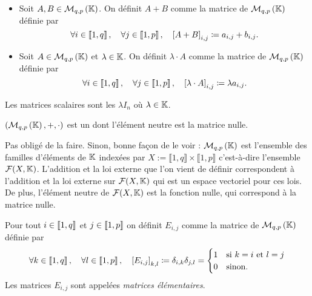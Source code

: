 \documentclass{magnolia}
\begin{document}
\begin{definition}[utile=-3]
$\quad$
\begin{itemize}
\item Soit $A,B\in\mathcal{M}_{q,p}\left(\mathbb{K}\right)$. On définit $A+B$ comme la matrice
  de $\mathcal{M}_{q,p}\left(\mathbb{K}\right)$ définie par
  \[\forall i\in\left\llbracket 1,q\right\rrbracket ,\quad \forall j\in\left\llbracket 1,p\right\rrbracket ,\quad
    \left[A+B\right]_{i,j}\coloneqq a_{i,j}+b_{i,j}.\]
\item Soit $A\in\mathcal{M}_{q,p}\left(\mathbb{K}\right)$ et $\lambda\in\mathbb{K}$. On définit 
  $\lambda\cdot A$  comme la matrice de $\mathcal{M}_{q,p}\left(\mathbb{K}\right)$ définie par
  \[\forall i\in\left\llbracket 1,q\right\rrbracket ,\quad \forall j\in\left\llbracket 1,p\right\rrbracket ,\quad
    \left[\lambda\cdot A\right]_{i,j}\coloneqq \lambda a_{i,j}.\]
\end{itemize}
\end{definition}

\begin{remarqueUnique}
\remarque Les matrices scalaires sont les $\lambda I_n$ où $\lambda\in\mathbb{K}$.
\end{remarqueUnique}

\begin{proposition}[utile=-3]
$\left(\mathcal{M}_{q,p}\left(\mathbb{K}\right),+,\cdot\right)$ est un \Kev dont l'élément neutre est la matrice
nulle.
\end{proposition}

\begin{preuve}
Pas obligé de la faire.
Sinon, bonne façon de le voir :
$\mathcal{M}_{q,p}\left(\mathbb{K}\right)$ est l'ensemble des familles d'éléments de $\mathbb{K}$ indexées par $X:=\llbracket 1,q\rrbracket \times \llbracket 1,p\rrbracket$ c'est-à-dire l'ensemble $\mathcal{F}(X, \mathbb{K})$. L'addition et la loi externe que l'on vient de définir correspondent à l'addition et la loi externe sur $\mathcal{F}(X, \mathbb{K})$ qui est un espace vectoriel pour ces lois. De plus, l'élément neutre de $\mathcal{F}(X, \mathbb{K})$ est la fonction nulle, qui correspond à la matrice nulle.
\end{preuve}

\begin{definition}[utile=-3]
Pour tout $i\in\left\llbracket 1,q\right\rrbracket$ et $j\in\left\llbracket 1,p\right\rrbracket$ on
définit $E_{i,j}$ comme la matrice de $\mathcal{M}_{q,p}\left(\mathbb{K}\right)$ définie par
\[\forall k\in\left\llbracket 1,q\right\rrbracket ,\quad \forall l\in\left\llbracket 1,p\right\rrbracket ,\quad
  \left[E_{i,j}\right]_{k,l}\coloneqq \delta_{i,k}\delta_{j,l}=
  \begin{cases}
  1 & \text{si $k=i$ et $l=j$}\\
  0 & \text{sinon.}
  \end{cases}\]
Les matrices $E_{i,j}$ sont appelées \emph{matrices élémentaires}.
\end{definition}
\end{document}
